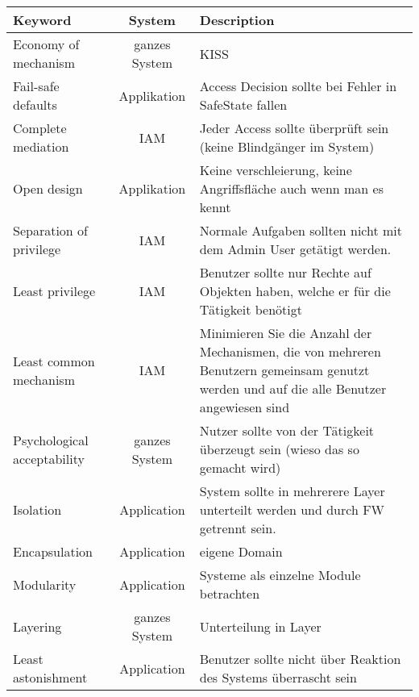 \begin{center}
    \begin{tabular}{l c p{8cm}}
        \hline
        \bfseries{Keyword}                        &    \bfseries{System}              & \bfseries{Description}\\
        \hline\hline
        Economy of mechanism           &   ganzes System        &   KISS\\\hline
        Fail-safe defaults             &   Applikation          &   Access Decision sollte bei Fehler in Safe\-State fallen\\\hline
        Complete mediation             &   IAM                  &   Jeder Access sollte überprüft sein (keine Blindgänger im System)\\\hline
        Open design                    &   Applikation          &   Keine verschleierung, keine Angriffsfläche auch wenn man es kennt\\\hline
        Separation of privilege        &   IAM                  &   Normale Aufgaben sollten nicht mit dem Admin User getätigt werden.\\\hline
        Least privilege                &   IAM                  &   Benutzer sollte nur Rechte auf Objekten haben, welche er für die Tätigkeit benötigt\\\hline
        Least common mechanism         &   IAM                  &   Minimieren Sie die Anzahl der Mechanismen, die von mehreren Benutzern gemeinsam genutzt werden und auf die alle Benutzer angewiesen sind\\\hline
        Psychological acceptability    &   ganzes System        &   Nutzer sollte von der Tätigkeit überzeugt sein (wieso das so gemacht wird)\\\hline
        Isolation                      &   Application          &   System sollte in mehrerere Layer unterteilt werden und durch FW getrennt sein.\\\hline
        Encapsulation                  &   Application          &   eigene Domain\\\hline
        Modularity                     &   Application          &   Systeme als einzelne Module betrachten\\\hline
        Layering                       &   ganzes System        &   Unterteilung in Layer \textit{\nameref{subsubsec:implementation-of-access-controls}}\\\hline
        Least astonishment             &   Application          &   Benutzer sollte nicht über Reaktion des Systems überrascht sein\\\hline
    \end{tabular}
\end{center}




